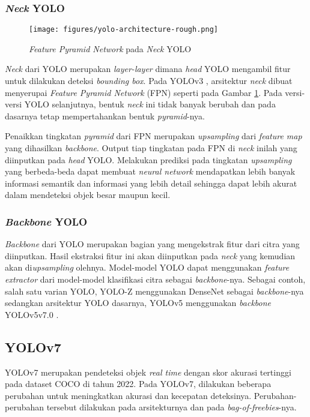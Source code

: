     \subsubsection{\emph{Neck} YOLO}
  
      \begin{figure}[ht]
          \centering
          \texttt{[image: figures/yolo-architecture-rough.png]}
          \caption{\emph{Feature Pyramid Network} pada \emph{Neck} YOLO}
          \label{fig:yolofpn}
      \end{figure}
  
      \emph{Neck} dari YOLO merupakan \emph{layer-layer} dimana \emph{head} YOLO mengambil fitur untuk dilakukan deteksi \emph{bounding box}.
      Pada YOLOv3 \textcite{yolov3}, arsitektur \emph{neck} dibuat menyerupai \emph{Feature Pyramid Network} (FPN) seperti pada Gambar \ref{fig:yolofpn}. 
      Pada versi-versi YOLO selanjutnya, bentuk \emph{neck} ini tidak banyak berubah dan pada dasarnya tetap mempertahankan bentuk \emph{pyramid}-nya.
  
      Penaikkan tingkatan \emph{pyramid} dari FPN merupakan \emph{upsampling} dari \emph{feature map} yang dihasilkan \emph{backbone}.
      Output tiap tingkatan pada FPN di \emph{neck} inilah yang diinputkan pada \emph{head} YOLO. 
      Melakukan prediksi pada tingkatan \emph{upsampling} yang berbeda-beda dapat membuat \emph{neural network} mendapatkan lebih banyak informasi semantik dan informasi yang lebih detail sehingga dapat lebih akurat dalam mendeteksi objek besar maupun kecil.
  
    \subsubsection{\emph{Backbone} YOLO}
      \emph{Backbone} dari YOLO merupakan bagian yang mengekstrak fitur dari citra yang diinputkan.
      Hasil ekstraksi fitur ini akan diinputkan pada \emph{neck} yang kemudian akan di\emph{upsampling} olehnya.
      Model-model YOLO dapat menggunakan \emph{feature extractor} dari model-model klasifikasi citra sebagai \emph{backbone}-nya.
      Sebagai contoh, salah satu varian YOLO, YOLO-Z menggunakan DenseNet sebagai \emph{backbone}-nya sedangkan arsitektur YOLO dasarnya, YOLOv5 menggunakan \emph{backbone} YOLOv5v7.0 \parencite{yoloz}.
  
  
  
  
  \subsection{YOLOv7}
    YOLOv7 merupakan pendeteksi objek \emph{real time} dengan skor akurasi tertinggi pada dataset COCO di tahun 2022.
    Pada YOLOv7, dilakukan beberapa perubahan untuk meningkatkan akurasi dan kecepatan deteksinya.
    Perubahan-perubahan tersebut dilakukan pada arsitekturnya dan pada \emph{bag-of-freebies}-nya.
  
